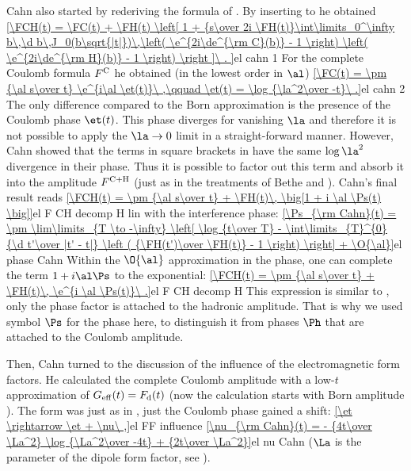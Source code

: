 Cahn  also started by rederiving the formula of \WY. By inserting  to  he obtained
\eqref{\FCH(t) = \FC(t)
+ \FH(t) \left[ 1 +
{s\over 2i \FH(t)}\int\limits_0^\infty b\,\d b\,J_0(b\sqrt{|t|})\,\left( \e^{2i\de^{\rm C}(b)} - 1 \right) \left( \e^{2i\de^{\rm H}(b)} - 1 \right)
\right ]\ .
}{el cahn 1}
For the complete Coulomb formula $F^{\rm C}$ he obtained (in the lowest order in $\al$)
\eqref{\FC(t) = \pm {\al s\over t} \e^{i\al \et(t)}\ ,\qquad \et(t) = \log {\la^2\over -t}\ .}{el cahn 2}
The only difference compared to the Born approximation  is the presence of the Coulomb phase $\et(t)$. This phase diverges for vanishing $\la$ and therefore it is not possible to apply the $\la\to 0$ limit in a straight-forward manner. However, Cahn showed that the terms in square brackets in  have the same $\log\la^2$ divergence in their phase. Thus it is possible to factor out this term and absorb it into the amplitude $F^{\rm C+H}$ (just as in the treatments of Bethe and \WY). Cahn's final result reads
\eqref{\FCH(t) = \pm {\al s\over t} + \FH(t)\, \big[1 + i \al \Ps(t) \big]}{el F CH decomp H lin}
with the interference phase:
\eqref{\Ps_{\rm Cahn}(t) = \pm \lim\limits_{T \to -\infty} \left[ \log {t\over T} - \int\limits_{T}^{0} {\d t'\over |t' - t|} \left ( {\FH(t')\over \FH(t)} - 1 \right) \right] + \O{\al}}{el phase Cahn}
Within the $\O{\al}$ approximation in the phase, one can complete the term $1+i\al\Ps$ to the exponential:
\eqref{\FCH(t) = \pm {\al s\over t} + \FH(t)\, \e^{i \al \Ps(t)}\ .}{el F CH decomp H}
This expression is similar to , only the phase factor is attached to the hadronic amplitude. That is why we used symbol $\Ps$ for the phase here, to distinguish it from phases $\Ph$ that are attached to the Coulomb amplitude.

Then, Cahn turned to the discussion of the influence of the electromagnetic form factors. He calculated the complete Coulomb amplitude with a low-$t$ approximation of $G_{\rm eff}(t) = F_{\rm d}(t)$ (now the calculation starts with Born amplitude ). The form was just as in , just the Coulomb phase gained a shift:
\eqref{\et \rightarrow \et + \nu\ ,}{el FF influence}
\eqref{\nu_{\rm Cahn}(t) = - {4t\over \La^2} \log {\La^2\over -4t} + {2t\over \La^2}}{el nu Cahn}
($\La$ is the parameter of the dipole form factor, see ).

